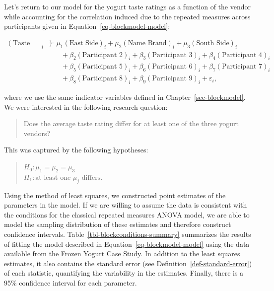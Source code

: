 \documentclass[
  letterpaper,
  DIV=11,
  numbers=noendperiod]{scrreprt}
\theoremstyle{definition}
\theoremstyle{definition}
\theoremstyle{plain}
\theoremstyle{remark}
\begin{document}
Let's return to our model for the yogurt taste ratings as a function of
the vendor while accounting for the correlation induced due to the
repeated measures across participants given in
Equation~\ref{eq-blockmodel-model}:

\[
\begin{aligned}
  (\text{Taste Rating})_i &= \mu_1 (\text{East Side})_i + \mu_2 (\text{Name Brand})_i + \mu_3 (\text{South Side})_i \\
    &\qquad + \beta_2 (\text{Participant 2})_i + \beta_3 (\text{Participant 3})_i + \beta_4 (\text{Participant 4})_i \\
    &\qquad + \beta_5 (\text{Participant 5})_i + \beta_6 (\text{Participant 6})_i + \beta_7 (\text{Participant 7})_i \\
    &\qquad + \beta_8 (\text{Participant 8})_i + \beta_9 (\text{Participant 9})_i + \varepsilon_i,
\end{aligned}
\]

where we use the same indicator variables defined in
Chapter~\ref{sec-blockmodel}. We were interested in the following
research question:

\begin{quote}
Does the average taste rating differ for at least one of the three
yogurt vendors?
\end{quote}

This was captured by the following hypotheses:

\begin{quote}
\(H_0: \mu_1 = \mu_2 = \mu_3\)\\
\(H_1: \text{at least one } \mu_j \text{ differs}.\)
\end{quote}

Using the method of least squares, we constructed point estimates of the
parameters in the model. If we are willing to assume the data is
consistent with the conditions for the classical repeated measures ANOVA
model, we are able to model the sampling distribution of these estimates
and therefore construct confidence intervals.
Table~\ref{tbl-blockconditions-summary} summarizes the results of
fitting the model described in Equation~\ref{eq-blockmodel-model} using
the data available from the Frozen Yogurt Case Study. In addition to the
least squares estimates, it also contains the standard error (see
Definition~\ref{def-standard-error}) of each statistic, quantifying the
variability in the estimates. Finally, there is a 95\% confidence
interval for each parameter.
\end{document}
